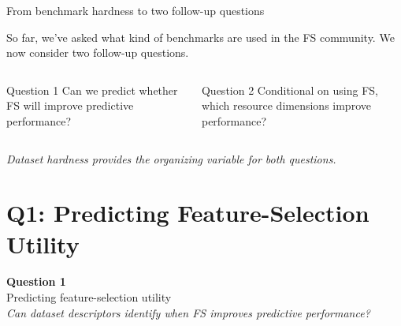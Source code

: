 \documentclass[aspectratio=169,10pt,dvipsnames]{beamer}
\begin{document}
\begin{frame}{From benchmark hardness to two follow-up questions}
\begin{center}
So far, we've asked what kind of benchmarks are used in the FS community. We now consider two
follow-up questions.
\end{center}

\vspace{0.3cm}
\begin{columns}[T]
\begin{block}{Question 1}
\centering
Can we predict whether FS will improve predictive performance?
\end{block}

\pause
{}
\begin{block}{Question 2}
\centering
Conditional on using FS, which resource dimensions improve performance?
\end{block}
\end{columns}

\pause
\vspace{0.5cm}
\begin{center}
\small\color{bgucolor!80}
\textit{Dataset hardness provides the organizing variable for both questions.}
\end{center}
\end{frame}


\section{Q1: Predicting Feature-Selection Utility}

{
\begin{frame}
\vspace{1.6cm}
\begin{center}
{\Large\bfseries\color{bgucolor} Question 1}\\[8pt]
{\large Predicting feature-selection utility}\\[16pt]
\small\color{gray}
\textit{Can dataset descriptors identify when FS improves predictive performance?}
\end{center}
\end{frame}
}
\end{document}
